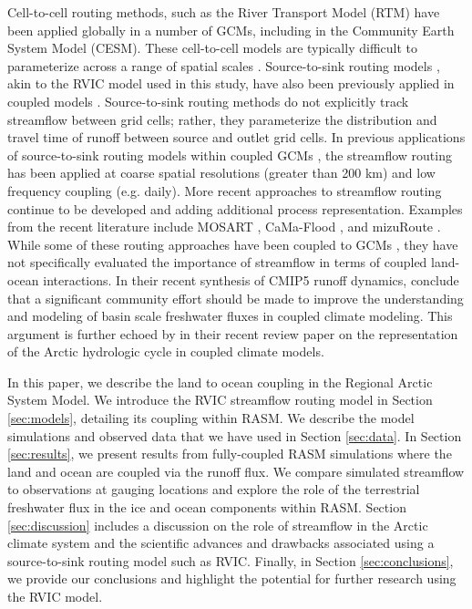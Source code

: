 \documentclass[jgrga, draft]{agutex}
\begin{document}
\begin{article}
Cell-to-cell routing methods, such as the River Transport Model (RTM) \citep{Branstetter_2003} have been applied globally in a number of GCMs, including in the Community Earth System Model (CESM).
These cell-to-cell models are typically difficult to parameterize across a range of spatial scales \citep{Sushama_2004}.
Source-to-sink routing models \citep[e.g.][]{Lohmann_1996,Naden_1992}, akin to the RVIC model used in this study, have also been previously applied in coupled models \citep[e.g.][]{Olivera_2000}.
Source-to-sink routing methods do not explicitly track streamflow between grid cells; rather, they parameterize the distribution and travel time of runoff between source and outlet grid cells.
In previous applications of source-to-sink routing models within coupled GCMs \citep[e.g.][]{Olivera_2000}, the streamflow routing has been applied at coarse spatial resolutions (greater than 200 km) and low frequency coupling (e.g. daily).
More recent approaches to streamflow routing continue to be developed and adding additional process representation.
Examples from the recent literature include MOSART \citep{Li_2013}, CaMa-Flood \citep{Yamazaki_2009,Yamazaki_2014}, and mizuRoute \citep{Clark_2016}.
While some of these routing approaches have been coupled to GCMs \citep[e.g.]{Sushama_2004, Olivera_2000,Li_2013}, they have not specifically evaluated the importance of streamflow in terms of coupled land-ocean interactions.
In their recent synthesis of CMIP5 runoff dynamics, \citet{Bring_2015} conclude that a significant community effort should be made to improve the understanding and modeling of basin scale freshwater fluxes in coupled climate modeling.
This argument is further echoed by \citet{Lique_2015} in their recent review paper on the representation of the Arctic hydrologic cycle in coupled climate models.

In this paper, we describe the land to ocean coupling in the Regional Arctic System Model.
We introduce the RVIC streamflow routing model in Section \ref{sec:models}, detailing its coupling within RASM.
We describe the model simulations and observed data that we have used in Section \ref{sec:data}.
In Section \ref{sec:results}, we present results from fully-coupled RASM simulations where the land and ocean are coupled via the runoff flux.
We compare simulated streamflow to observations at gauging locations and explore the role of the terrestrial freshwater flux in the ice and ocean components within RASM.
Section \ref{sec:discussion} includes a discussion on the role of streamflow in the Arctic climate system and the scientific advances and drawbacks associated using a source-to-sink routing model such as RVIC.
Finally, in Section \ref{sec:conclusions}, we provide our conclusions and highlight the potential for further research using the RVIC model.


\end{article}
\end{document}
